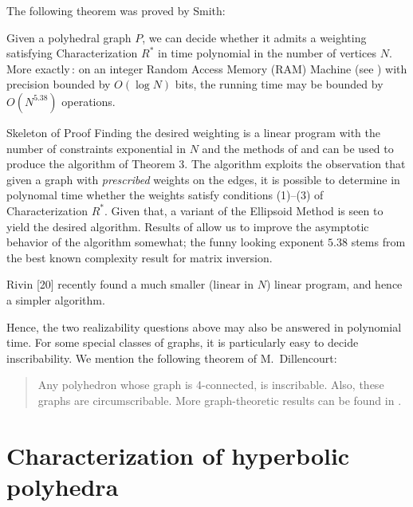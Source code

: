 The following theorem was proved by Smith:
\begin{Theorem}
Given a polyhedral graph $P$, we can decide whether it 
admits a
weighting satisfying Characterization $R^*$ in time 
polynomial in the
number of vertices $N$. More exactly\,\RM:
on an integer Random Access Memory \RM(RAM\/\RM) Machine 
\RM(see \cite{aho74}\RM)
with precision bounded by $O ( \log N )$ bits, the running 
time may be
bounded by $O(N^{5.38})$ operations.
\end{Theorem}

\begin{proof*}{Skeleton of Proof}
Finding the desired weighting 
is a linear program with the number of constraints 
exponential in $N$
and the methods  of \cite{gls:opt} and
\cite{vai:opt} can be used to produce the algorithm of 
Theorem 3. The
algorithm exploits the observation that given a graph with 
{\em
prescribed} weights on the edges, it is possible to 
determine in
polynomal time whether the weights satisfy conditions 
(1)--(3) of
Characterization $R^*$. Given that, a variant of the 
Ellipsoid Method
is seen to yield the desired algorithm. Results of 
\cite{vai:opt}
allow us to improve the asymptotic behavior of the 
algorithm somewhat;
the funny looking exponent $5.38$ stems from the best 
known complexity
result for matrix inversion. 

\begin{Note}
Rivin [20] recently found a much smaller
(linear in $N$) linear program, and hence a simpler 
algorithm.
\end{Note}

Hence, the two realizability questions above may also be 
answered
in polynomial time. For some special classes of graphs,  
it is particularly
easy to decide inscribability. We mention the following 
theorem of
M.~Dillencourt:

\begin{quote}
Any polyhedron whose graph
is 4-connected, is inscribable. 
Also, these graphs are circumscribable.
More graph-theoretic results
can be found in \cite{DS}. 
\end{quote}
\renewcommand{\qed}{}
\end{proof*}

\section{Characterization of hyperbolic polyhedra}
\label{sec-outline}


